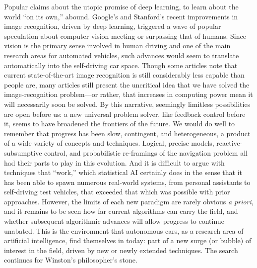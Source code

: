 Popular claims
about the utopic promise of deep learning, to
learn about the world ``on its own,''
abound. Google's and Stanford's recent
improvements in image recognition, driven by deep learning,
\cite{markoffImage} triggered a wave 
of popular speculation about computer vision meeting or surpassing
that of humans. Since vision is the primary sense involved in human driving
and one of the main research areas for automated vehicles, such
advances would seem to translate automatically into the self-driving
car space. Though some articles note that current
state-of-the-art image recognition is still considerably less capable
than people are, many articles still present the uncritical idea that we have solved
the image-recognition problem---or rather, that increases in computing
power mean it will necessarily soon be solved. By this narrative, seemingly limitless
possibilities are open before us: a new universal problem solver, like
feedback control before it, seems to have broadened the frontiers
of the future. 
We would do well to remember that 
progress has been slow, contingent, and heterogeneous, a product of a
wide variety of concepts and techniques. Logical, precise models,
reactive-subsumptive control, and probabilistic re-framings of the
navigation problem all had their parts to play in this evolution. And
it is difficult to argue with techniques that ``work,'' which
statistical AI certainly does in the sense that it has been able to
spawn numerous real-world systems, from personal assistants to
self-driving test vehicles, that exceeded that which was possible with
prior approaches. However, the limits of each new paradigm are rarely
obvious \emph{a priori}, and it remains to be seen how far current
algorithms can carry the field, and whether subsequent algorithmic
advances will allow progress to continue unabated. This is the
environment that autonomous cars, as a 
research area of artificial intelligence, find themselves in today:
part of a new surge (or bubble) of interest in the field, driven by new
or newly extended techniques. The search continues for Winston's
philosopher's stone.

